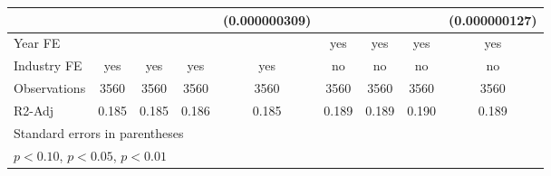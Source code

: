 \begin{table}[htbp]
\begin{tabular}{l*{8}{c}}
                    &                     &                     &                     &(0.000000309)         &                     &                     &                     &(0.000000127)         \\
\hline
Year FE             &                     &                     &                     &                     &         yes         &         yes         &         yes         &         yes         \\
Industry FE         &         yes         &         yes         &         yes         &         yes         &          no         &          no         &          no         &          no         \\
Observations        &        3560         &        3560         &        3560         &        3560         &        3560         &        3560         &        3560         &        3560         \\
R2-Adj              &       0.185         &       0.185         &       0.186         &       0.185         &       0.189         &       0.189         &       0.190         &       0.189         \\
\hline\hline
\multicolumn{9}{l}{\footnotesize Standard errors in parentheses}\\
\multicolumn{9}{l}{\footnotesize \sym{*} \(p<0.10\), \sym{**} \(p<0.05\), \sym{***} \(p<0.01\)}\\
\end{tabular}
\end{table}
